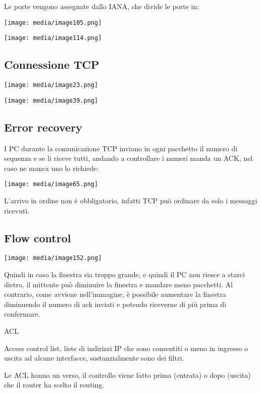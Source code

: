 Le porte vengono assegnate dallo IANA, che divide le porte in:

\texttt{[image: media/image105.png]}

\texttt{[image: media/image114.png]}

\subsection{Connessione TCP}\label{connessione-tcp}

\texttt{[image: media/image23.png]}

\texttt{[image: media/image39.png]}

\subsection{Error recovery}\label{error-recovery}

I PC durante la comunicazione TCP inviano in ogni pacchetto il numero di
sequenza e se li riceve tutti, andando a controllare i numeri manda un
ACK, nel caso ne manca uno lo richiede:

\texttt{[image: media/image65.png]}

L'arrivo in ordine non è obbligatorio, infatti TCP può ordinare da solo
i messaggi ricevuti.

\subsection{Flow control}\label{flow-control}

\texttt{[image: media/image152.png]}

Quindi in caso la finestra sia troppo grande, e quindi il PC non riesce
a starci dietro, il mittente può diminuire la finestra e mandare meno
pacchetti. Al contrario, come avviene nell'immagine, è possibile
aumentare la finestra diminuendo il numero di ack inviati e potendo
riceverne di più prima di confermare.

ACL

Access control list, liste di indirizzi IP che sono consentiti o meno in
ingresso o uscita ad alcune interfacce, sostanzialmente sono dei filtri.

Le ACL hanno un verso, il controllo viene fatto prima (entrata) o dopo
(uscita) che il router ha scelto il routing.

